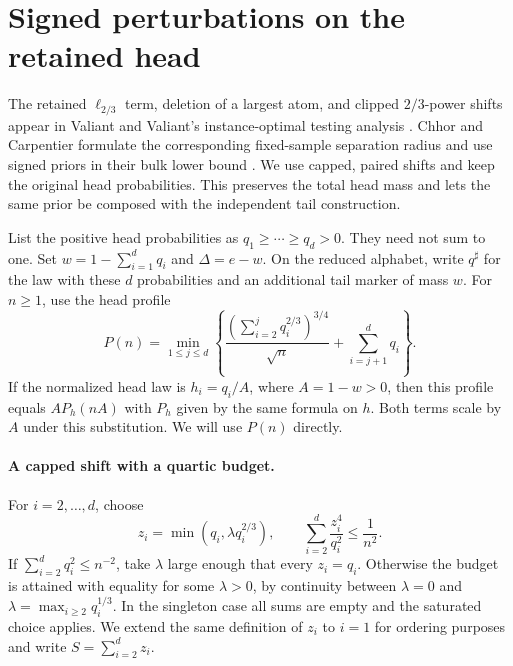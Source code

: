 \section{Signed perturbations on the retained head}
\label{sec:signed-head-lower}

The retained \(\ell_{2/3}\) term, deletion of a largest atom, and
clipped \(2/3\)-power shifts appear in Valiant and Valiant's
instance-optimal testing analysis \cite{valiantvaliant2017}.
Chhor and Carpentier formulate the corresponding fixed-sample
separation radius and use signed priors in their bulk lower bound
\cite[Corollary~1 and Section~5.1]{chhorcarpentier2022}. We use
capped, paired shifts and keep the original head probabilities. This
preserves the total head mass and lets the same prior be composed with
the independent tail construction.

List the positive head probabilities as \(q_1\ge\cdots\ge q_d>0\).
They need not sum to one. Set \(w=1-\sum_{i=1}^{d}q_i\) and
\(\Delta=e-w\). On the reduced alphabet, write \(q^\sharp\) for the
law with these \(d\) probabilities and an additional tail marker of
mass \(w\). For \(n\ge1\), use the head profile
\begin{equation}
 P(n)=\min_{1\le j\le d}
 \left\{
  \frac{\left(\sum_{i=2}^{j}q_i^{2/3}\right)^{3/4}}{\sqrt n}
  +\sum_{i=j+1}^{d}q_i
 \right\}.
 \label{eq:signed-head-profile}
\end{equation}
If the normalized head law is \(h_i=q_i/A\), where \(A=1-w>0\),
then this profile equals \(A P_h(nA)\) with \(P_h\) given by the
same formula on \(h\). Both terms scale by \(A\) under this
substitution. We will use \(P(n)\) directly.

\paragraph{A capped shift with a quartic budget.}
For \(i=2,\ldots,d\), choose
\[
 z_i=\min(q_i,\lambda q_i^{2/3}),
 \qquad
 \sum_{i=2}^{d}\frac{z_i^4}{q_i^2}\le\frac1{n^2}.
\]
If \(\sum_{i=2}^{d}q_i^2\le n^{-2}\), take \(\lambda\) large
enough that every \(z_i=q_i\). Otherwise the budget is attained with
equality for some \(\lambda>0\), by continuity between
\(\lambda=0\) and \(\lambda=\max_{i\ge2}q_i^{1/3}\). In the
singleton case all sums are empty and the saturated choice applies.
We extend the same definition of \(z_i\) to \(i=1\) for ordering
purposes and write \(S=\sum_{i=2}^{d}z_i\).

